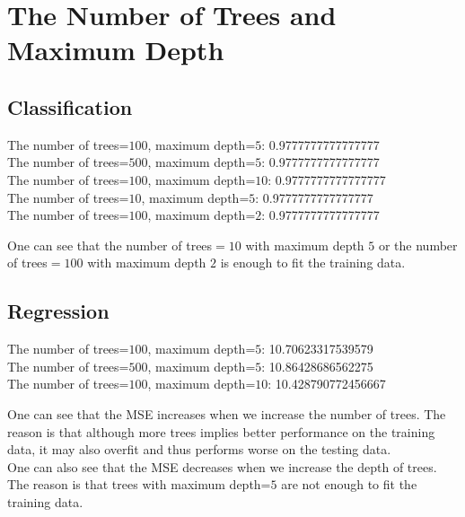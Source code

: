 \section{The Number of Trees and Maximum Depth}

\subsection{Classification}
\noindent
The number of trees=$100$, maximum depth=$5$: 0.9777777777777777\\
The number of trees=$500$, maximum depth=$5$: 0.9777777777777777\\
The number of trees=$100$, maximum depth=$10$: 0.9777777777777777\\
The number of trees=$10$, maximum depth=$5$: 0.9777777777777777\\
The number of trees=$100$, maximum depth=$2$: 0.9777777777777777

One can see that the number of trees$=10$ with maximum depth $5$ or the number of trees$=100$ with maximum depth $2$ is enough to fit the training data.

\subsection{Regression}
\noindent
The number of trees=$100$, maximum depth=$5$: 10.70623317539579\\
The number of trees=$500$, maximum depth=$5$: 10.86428686562275\\
The number of trees=$100$, maximum depth=$10$: 10.428790772456667

One can see that the MSE increases when we increase the number of trees. The reason is that although more trees implies better performance on the training data, it may also overfit and thus performs worse on the testing data.\\
One can also see that the MSE decreases when we increase the depth of trees. The reason is that trees with maximum depth=$5$ are not enough to fit the training data.
